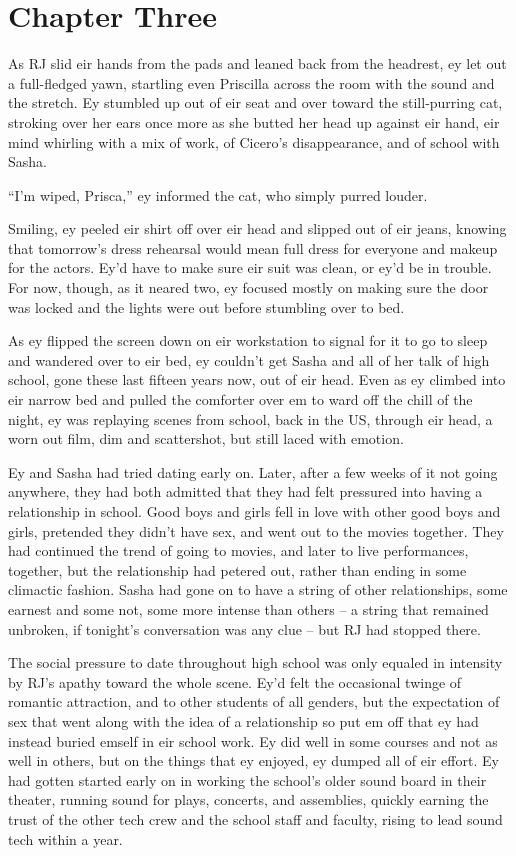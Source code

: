 \chapter*{Chapter Three}

As RJ slid eir hands from the pads and leaned back from the headrest, ey let out a full-fledged yawn, startling even Priscilla across the room with the sound and the stretch.  Ey stumbled up out of eir seat and over toward the still-purring cat, stroking over her ears once more as she butted her head up against eir hand, eir mind whirling with a mix of work, of Cicero's disappearance, and of school with Sasha.

``I'm wiped, Prisca,'' ey informed the cat, who simply purred louder.

Smiling, ey peeled eir shirt off over eir head and slipped out of eir jeans, knowing that tomorrow's dress rehearsal would mean full dress for everyone and makeup for the actors.  Ey'd have to make sure eir suit was clean, or ey'd be in trouble.  For now, though, as it neared two, ey focused mostly on making sure the door was locked and the lights were out before stumbling over to bed.

As ey flipped the screen down on eir workstation to signal for it to go to sleep and wandered over to eir bed, ey couldn't get Sasha and all of her talk of high school, gone these last fifteen years now, out of eir head.  Even as ey climbed into eir narrow bed and pulled the comforter over em to ward off the chill of the night, ey was replaying scenes from school, back in the US, through eir head, a worn out film, dim and scattershot, but still laced with emotion.

Ey and Sasha had tried dating early on.  Later, after a few weeks of it not going anywhere, they had both admitted that they had felt pressured into having a relationship in school.  Good boys and girls fell in love with other good boys and girls, pretended they didn't have sex, and went out to the movies together.  They had continued the trend of going to movies, and later to live performances, together, but the relationship had petered out, rather than ending in some climactic fashion.  Sasha had gone on to have a string of other relationships, some earnest and some not, some more intense than others -- a string that remained unbroken, if tonight's conversation was any clue -- but RJ had stopped there.

The social pressure to date throughout high school was only equaled in intensity by RJ's apathy toward the whole scene.  Ey'd felt the occasional twinge of romantic attraction, and to other students of all genders, but the expectation of sex that went along with the idea of a relationship so put em off that ey had instead buried emself in eir school work.  Ey did well in some courses and not as well in others, but on the things that ey enjoyed, ey dumped all of eir effort.  Ey had gotten started early on in working the school's older sound board in their theater, running sound for plays, concerts, and assemblies, quickly earning the trust of the other tech crew and the school staff and faculty, rising to lead sound tech within a year.


